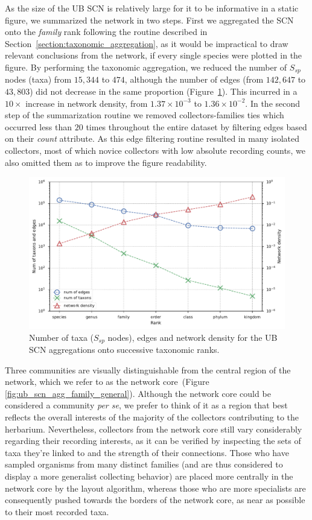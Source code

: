 As the size of the UB SCN is relatively large for it to be informative in a static figure, we summarized the network in two steps.
First we aggregated the SCN onto the \textit{family} rank following the routine described in Section~\ref{section:taxonomic_aggregation}, as it would be impractical to draw relevant conclusions from the network, if every single species were plotted in the figure.
By performing the taxonomic aggregation, we reduced the number of $S_{sp}$ nodes (taxa) from $15,344$ to $474$, although the number of edges (from $142,647$ to $43,803$) did not decrease in the same proportion (Figure~\ref{fig:ub_scn_tax_agg_curves}).
This incurred in a $10 \times$ increase in network density, from $1.37\times 10^{-3}$ to $1.36\times 10^{-2}$.
In the second step of the summarization routine we removed collectors-families ties which occurred less than $20$ times throughout the entire dataset by filtering edges based on their \textit{count} attribute.
As this edge filtering routine resulted in many isolated collectors, most of which novice collectors with low absolute recording counts, we also omitted them as to improve the figure readability.

\begin{figure}[!ht]
  	\centering
    \includegraphics[width=\linewidth]{figures/casestudy_ub/scn_tax_agg_curves.pdf}
    \caption{Number of taxa ($S_{sp}$ nodes), edges and network density for the UB SCN aggregations onto successive taxonomic ranks.}
    \label{fig:ub_scn_tax_agg_curves}
  \end{figure}

Three communities are visually distinguishable from the central region of the network, which we refer to as the network core~(Figure \ref{fig:ub_scn_agg_family_general}).
Although the network core could be considered a community \textit{per se}, we prefer to think of it as a region that best reflects the overall interests of the majority of the collectors contributing to the herbarium.
Nevertheless, collectors from the network core still vary considerably regarding their recording interests, as it can be verified by inspecting the sets of taxa they're linked to and the strength of their connections. 
Those who have sampled organisms from many distinct families (and are thus considered to display a more generalist collecting behavior) are placed more centrally in the network core by the layout algorithm, whereas those who are more specialists are consequently pushed towards the borders of the network core, as near as possible to their most recorded taxa.


